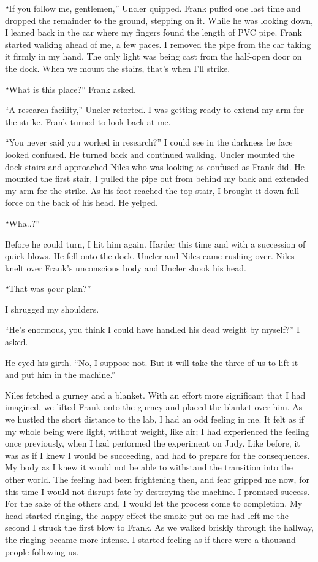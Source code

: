 \documentclass[
]{article}
\begin{document}
``If you follow me, gentlemen,'' Uncler quipped. Frank puffed one last
time and dropped the remainder to the ground, stepping on it. While he
was looking down, I leaned back in the car where my fingers found the
length of PVC pipe. Frank started walking ahead of me, a few paces. I
removed the pipe from the car taking it firmly in my hand. The only
light was being cast from the half-open door on the dock. When we mount
the stairs, that's when I'll strike.

``What is this place?'' Frank asked.

``A research facility,'' Uncler retorted. I was getting ready to extend
my arm for the strike. Frank turned to look back at me.

``You never said you worked in research?'' I could see in the darkness
he face looked confused. He turned back and continued walking. Uncler
mounted the dock stairs and approached Niles who was looking as confused
as Frank did. He mounted the first stair, I pulled the pipe out from
behind my back and extended my arm for the strike. As his foot reached
the top stair, I brought it down full force on the back of his head. He
yelped.

``Wha..?''

Before he could turn, I hit him again. Harder this time and with a
succession of quick blows. He fell onto the dock. Uncler and Niles came
rushing over. Niles knelt over Frank's unconscious body and Uncler shook
his head.

``That was \emph{your} plan?''

I shrugged my shoulders.

``He's enormous, you think I could have handled his dead weight by
myself?'' I asked.

He eyed his girth. ``No, I suppose not. But it will take the three of us
to lift it and put him in the machine.''

Niles fetched a gurney and a blanket. With an effort more significant
that I had imagined, we lifted Frank onto the gurney and placed the
blanket over him. As we hustled the short distance to the lab, I had an
odd feeling in me. It felt as if my whole being were light, without
weight, like air; I had experienced the feeling once previously, when I
had performed the experiment on Judy. Like before, it was as if I knew I
would be succeeding, and had to prepare for the consequences. My body as
I knew it would not be able to withstand the transition into the other
world. The feeling had been frightening then, and fear gripped me now,
for this time I would not disrupt fate by destroying the machine. I
promised success. For the sake of the others and, I would let the
process come to completion. My head started ringing, the happy effect
the smoke put on me had left me the second I struck the first blow to
Frank. As we walked briskly through the hallway, the ringing became more
intense. I started feeling as if there were a thousand people following
us.
\end{document}
